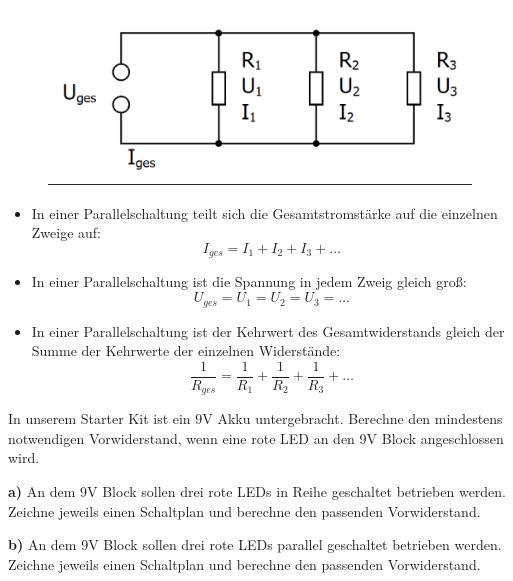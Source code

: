 \begin{tcolorbox}[equal height group=A,enhanced, colback=CadetBlue!70!green, coltext=black, colframe=DarkCyan!70!DarkGreen, width=0.48\textwidth, before=, after=\hfill, adjusted title={Elektrische Stromstärke und Spannung in der Parallelschaltung}, colbacktitle=CadetBlue!70!green, coltitle=black,fonttitle=\bfseries]
	\begin{figure}[H]
		\centering
		\includegraphics[width=\textwidth]{./Zeichnungen/parallelschaltung.png}
	\end{figure}
	\begin{itemize}[parsep=0ex,itemsep=0ex,leftmargin=*]
		\item In einer Parallelschaltung teilt sich die Gesamtstromstärke auf die einzelnen Zweige auf:
		\begin{equation*}
			I_{ges}=I_1+I_2+ I_3+\dots
		\end{equation*}
		\item In einer Parallelschaltung ist die Spannung in jedem Zweig gleich groß:
		\begin{equation*}
			U_{ges}=U_1=U_2=U_3=\dots
		\end{equation*}
		\item In einer Parallelschaltung ist der Kehrwert des Gesamtwiderstands gleich der Summe der Kehrwerte der einzelnen Widerstände:
		\begin{equation*}
			\frac{1}{R_{ges}} = \frac{1}{R_1} + \frac{1}{R_2} + \frac{1}{R_3} + \dots
		\end{equation*}
	\end{itemize}
\end{tcolorbox}

\begin{aufgabe}
	In unserem Starter Kit ist ein 9V Akku untergebracht. Berechne den mindestens notwendigen Vorwiderstand, wenn eine
	rote LED an den 9V Block angeschlossen wird.
\end{aufgabe}

\begin{aufgabe}
	\smallbreak
	\textbf{a)} An dem 9V Block sollen drei rote LEDs in Reihe geschaltet betrieben werden. Zeichne jeweils einen Schaltplan und berechne den passenden Vorwiderstand.
	
	\textbf{b)} An dem 9V Block sollen drei rote LEDs parallel geschaltet betrieben werden. Zeichne jeweils einen Schaltplan und berechne den passenden Vorwiderstand.
\end{aufgabe}
\vfill

